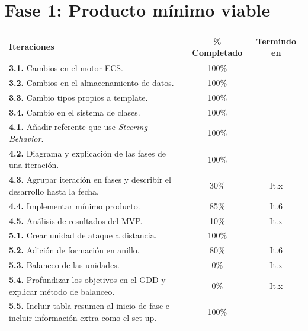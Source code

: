 \section{Fase 1: Producto mínimo viable}
\begin{longtable}[c]{|p{7cm}|c|c|}
\hline
Iteraciones                                               & \% Completado & Termindo en \\ 
\hline
\endhead
\textbf{3.1.} Cambios en el motor ECS.                     & 100\% &   \\
	\cmidrule[.003pt]{1-3}
\textbf{3.2.} Cambios en el almacenamiento de datos.       & 100\% &   \\ 
	\cmidrule[.003pt]{1-3}
\textbf{3.3.} Cambio tipos propios a template.             & 100\% &   \\ 
	\cmidrule[.003pt]{1-3}
\textbf{3.4.} Cambio en el sistema de clases.              & 100\% &   \\
	
	\cmidrule[1pt]{1-3}

\textbf{4.1.} Añadir referente que use 
				\textit{Steering Behavior}.                & 100\% &   \\
	\cmidrule[.003pt]{1-3}
\textbf{4.2.} Diagrama y explicación de las fases de 
				una iteración.                             & 100\% &   \\
	\cmidrule[.003pt]{1-3}
\textbf{4.3.} Agrupar iteración en fases y describir el
				desarrollo hasta la fecha.                 & 30\%  &  It.x \\
	\cmidrule[.003pt]{1-3}
\textbf{4.4.} Implementar mínimo producto.                 & 85\%  &  It.6 \\
	\cmidrule[.003pt]{1-3}
\textbf{4.5.} Análisis de resultados del MVP.              & 10\%  &  It.x \\
	
	\cmidrule[1pt]{1-3}
	
\textbf{5.1.} Crear unidad de ataque a distancia.          & 100\% &   \\
	\cmidrule[.003pt]{1-3}
\textbf{5.2.} Adición de formación en anillo.              & 80\%  &  It.6 \\ 
	\cmidrule[.003pt]{1-3}
\textbf{5.3.} Balanceo de las unidades.                    & 0\%   &  It.x \\ 
	\cmidrule[.003pt]{1-3}		
\textbf{5.4.} Profundizar los objetivos en el GDD y 
				explicar método de balanceo.               & 0\%   &  It.x \\ 
	\cmidrule[.003pt]{1-3}		
\textbf{5.5.} Incluir tabla resumen al inicio de fase
				e incluir información extra como el set-up.& 100\%  &  \\


\end{longtable}

